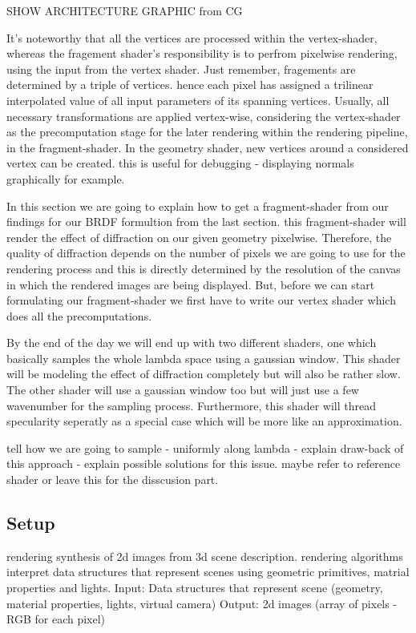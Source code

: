 SHOW ARCHITECTURE GRAPHIC from CG


It's noteworthy that all the vertices are processed within the vertex-shader, whereas the fragement shader's responsibility is to perfrom pixelwise rendering, using the input from the vertex shader. Just remember, fragements are determined by a triple of vertices. hence each pixel has assigned a trilinear interpolated value of all input parameters of its spanning vertices.
Usually, all necessary transformations are applied vertex-wise, considering the vertex-shader as the precomputation stage for the later rendering within the rendering pipeline, in the fragment-shader. In the geometry shader, new vertices around a considered vertex can be created. this is useful for debugging - displaying normals graphically for example.

In this section we are going to explain how to get a fragment-shader from our findings for our BRDF formultion from the last section.  this fragment-shader will render the effect of diffraction on our given geometry pixelwise. Therefore, the quality of diffraction depends on the number of pixels we are going to use for the rendering process and this is directly determined by the resolution of the canvas in which the rendered images are being displayed. 
But, before we can start formulating our fragment-shader we first have to write our vertex shader which does all the precomputations. 
 
By the end of the day we will end up with two different shaders, one which basically samples the whole lambda space using a gaussian window. This shader will be modeling the effect of diffraction completely but will also be rather slow. The other shader will use a gaussian window too but will just use a few wavenumber for the sampling process. Furthermore, this shader will thread specularity seperatly as a special case which will be more like an approximation. 


tell how we are going to sample - uniformly along lambda - explain draw-back of this approach - explain possible solutions for this issue. maybe refer to reference shader or leave this for the disscusion part.



\subsection{Setup}






rendering synthesis of 2d images from 3d scene description. rendering algorithms interpret data structures that represent scenes using geometric primitives, matrial properties and lights.
Input: Data structures that represent scene (geometry, material properties, lights, virtual camera)
Output: 2d images (array of pixels - RGB for each pixel)

